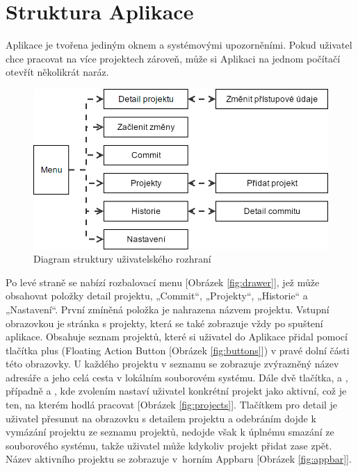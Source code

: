 \section{Struktura Aplikace}

Aplikace je tvořena jediným oknem a systémovými upozorněními. Pokud uživatel chce pracovat na více projektech zároveň, může si Aplikaci na jednom počítačí otevřít několikrát naráz.

\FloatBarrier
\begin{figure}[ht]
	\centering
	\includegraphics[width=\textwidth]{sections/ui/images/flow.png}
	\caption{Diagram struktury uživatelského rozhraní}
\end{figure}
\FloatBarrier

Po levé straně se nabízí rozbalovací menu [Obrázek \ref{fig:drawer}], jež může obsahovat položky detail projektu, „Commit“, „Projekty“, „Historie“ a „Nastavení“. První zmíněná položka je nahrazena názvem projektu. Vstupní obrazovkou je stránka s projekty, která se také zobrazuje vždy po spuštení aplikace. Obsahuje seznam projektů, které si uživatel do Aplikace přidal pomocí tlačítka plus (Floating Action Button [Obrázek \ref{fig:buttons}]) v pravé dolní části této obrazovky. U každého projektu v seznamu se zobrazuje zvýrazněný název adresáře a jeho celá cesta v lokálním souborovém systému. Dále dvě tlačítka,  a , případně  a , kde zvolením nastaví uživatel konkrétní projekt jako aktivní, což je ten, na kterém hodlá pracovat [Obrázek \ref{fig:projects}]. Tlačítkem pro detail je uživatel přesunut na obrazovku s detailem projektu a odebráním dojde k vymázání projektu ze seznamu projektů, nedojde však k úplnému smazání ze souborového systému, takže uživatel může kdykoliv projekt přidat zase zpět. Název aktivního projektu se zobrazuje v~horním Appbaru [Obrázek \ref{fig:appbar}].

